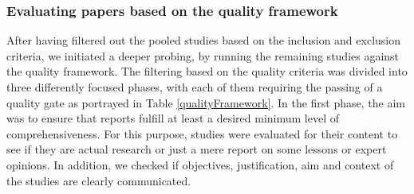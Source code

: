 \documentclass{bmcart}
\begin{document}





\subsubsection{Evaluating papers based on the quality framework}

After having filtered out the pooled studies based on the inclusion and exclusion criteria, we initiated a deeper probing, by running the remaining studies against the quality framework. The filtering based on the quality criteria was divided into three differently focused phases, with each of them requiring the passing of a quality gate as portrayed in Table \ref{qualityFramework}. In the first phase, the aim was to ensure that reports fulfill at least a desired minimum level of comprehensiveness. For this purpose, studies were evaluated for their content to see if they are actual research or just a mere report on some lessons or expert opinions. In addition, we checked if objectives, justification, aim and context of the studies are clearly communicated.
\end{document}
